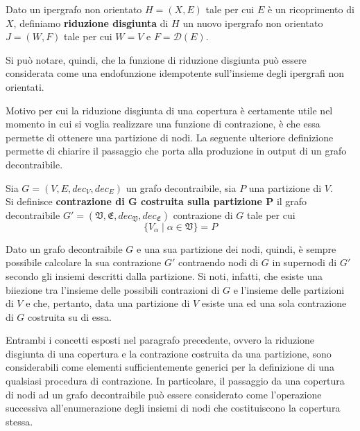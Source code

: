 \begin{definition}
    Dato un ipergrafo non orientato $H = (X, E)$ tale per cui $E$ \`e un ricoprimento di $X$,
    definiamo \textbf{riduzione disgiunta} di $H$ un nuovo ipergrafo non orientato $J = (W, F)$
    tale per cui $W = V$ e $F = \mathcal{D}(E)$.
\end{definition}

Si pu\`o notare, quindi, che la funzione di riduzione disgiunta pu\`o essere considerata come una
endofunzione idempotente sull'insieme degli ipergrafi non orientati.
\newpage


Motivo per cui la riduzione disgiunta di una copertura è certamente utile nel momento in cui si voglia
realizzare una funzione di contrazione, è che essa permette di ottenere una partizione di nodi.
La seguente ulteriore definizione permette di chiarire il passaggio che porta alla produzione in output di un grafo
decontraibile.

\begin{definition}
Sia $G = (V, E, dec_V, dec_E)$ un grafo decontraibile, sia $P$ una partizione di $V$. \\
Si definisce \textbf{contrazione di G costruita sulla partizione P} il grafo decontraibile
$G' = (\mathfrak{V}, \mathfrak{E}, dec_{\mathfrak{V}}, dec_{\mathfrak{E}})$ contrazione di $G$ tale per cui
    \begin{equation*}
        \{V_\alpha \mid \alpha \in \mathfrak{V}\} = P
    \end{equation*}
\end{definition}

Dato un grafo decontraibile $G$ e una sua partizione dei nodi, quindi, è sempre possibile calcolare la sua
contrazione $G'$ contraendo nodi di $G$ in supernodi di $G'$ secondo gli insiemi descritti dalla partizione.
Si noti, infatti, che esiste una biiezione tra l'insieme delle possibili contrazioni di $G$ e l'insieme delle
partizioni di $V$ e che, pertanto, data una partizione di $V$ esiste una ed una sola contrazione di $G$ costruita
su di essa.

\label{sec:make_decontractible_graph}

Entrambi i concetti esposti nel paragrafo precedente, ovvero la riduzione disgiunta di una copertura e la
contrazione costruita da una partizione, sono considerabili come elementi sufficientemente generici
per la definizione di una qualsiasi procedura di contrazione.
In particolare, il passaggio da una copertura
di nodi ad un grafo decontraibile può essere considerato come l'operazione successiva all'enumerazione degli
insiemi di nodi che costituiscono la copertura stessa.

